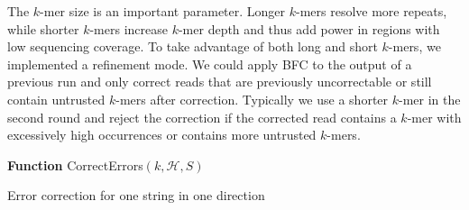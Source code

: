 \documentclass{bioinfo}
\begin{document}
\begin{methods}
The $k$-mer size is an important parameter. Longer $k$-mers resolve more
repeats, while shorter $k$-mers increase $k$-mer depth and thus add power in
regions with low sequencing coverage. To take advantage of both long and short
$k$-mers, we implemented a refinement mode. We could apply BFC to the output
of a previous run and only correct reads that are previously uncorrectable or 
still contain untrusted $k$-mers after correction. Typically we use a shorter
$k$-mer in the second round and reject the correction if the corrected read
contains a $k$-mer with excessively high occurrences or contains more untrusted
$k$-mers.


\begin{algorithm}[ht]
\DontPrintSemicolon
\footnotesize
{}
\BlankLine
\textbf{Function} {\sc CorrectErrors}$(k, \mathcal{H}, S)$
\caption{Error correction for one string in one direction}
\end{algorithm}

\end{methods}
\end{document}
